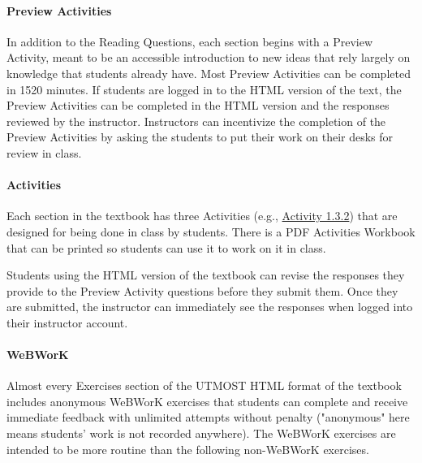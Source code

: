\documentclass[10pt,]{article}
\begin{document}
\paragraph[{Preview Activities}]{Preview Activities}\hypertarget{paragraphs-7}{}
\hypertarget{p-22}{}%
In addition to the Reading Questions, each section begins with a Preview Activity, meant to be an accessible introduction to new ideas that rely largely on knowledge that students already have. Most Preview Activities can be completed in 15\textendash{}20 minutes. If students are logged in to the HTML version of the text, the Preview Activities can be completed in the HTML version and the responses reviewed by the instructor.  Instructors can incentivize the completion of the Preview Activities by asking the students to put their work on their desks for review in class.%
\typeout{************************************************}
\typeout{************************************************}
\paragraph[{Activities}]{Activities}\hypertarget{paragraphs-8}{}
\hypertarget{p-23}{}%
Each section in the textbook has three Activities (e.g., \href{https://books.aimath.org/ac/sec-1-3-derivative-pt.html\#Mtw}{Activity 1.3.2}) that are designed for being done in class by students. There is a PDF Activities Workbook that can be printed so students can use it to work on it in class.%
\par
\hypertarget{p-24}{}%
Students using the HTML version of the textbook can revise the responses they provide to the Preview Activity questions before they submit them. Once they are submitted, the instructor can immediately see the responses when logged into their instructor account.%
\typeout{************************************************}
\typeout{************************************************}
\paragraph[{WeBWorK}]{WeBWorK}\hypertarget{paragraphs-9}{}
\hypertarget{p-25}{}%
Almost every Exercises section of the UTMOST HTML format of the textbook includes anonymous WeBWorK exercises that students can complete and receive immediate feedback with unlimited attempts without penalty ("anonymous" here means students' work is not recorded anywhere). The WeBWorK exercises are intended to be more routine than the following non-WeBWorK exercises.%
\typeout{************************************************}
\typeout{************************************************}
\end{document}
